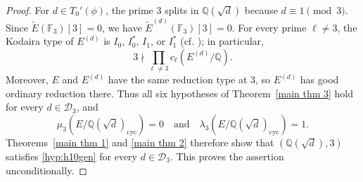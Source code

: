 \documentclass[12pt]{amsart}
\newtheorem{lemma}[theorem]{Lemma}
\newcommand{\Q}{\mathbb{Q}}
\newcommand{\F}{\mathbb{F}}
\newcommand{\op}[1]{\operatorname{#1}}
\numberwithin{equation}{section}
\begin{document}
\begin{proof}
For $d\in T_0'(\phi)$, the prime $3$ splits in $\Q(\sqrt d)$ because $d\equiv1\pmod 3$. Since $\widetilde E(\F_3)[3]=0$, we have $\widetilde E^{(d)}(\F_3)[3]=0$. For every prime $\ell\neq3$, the Kodaira type of $E^{(d)}$ is $I_0$, $I_0^*$, $I_1$, or $I_1^*$ (cf. \cite[Table~3]{BKOS}); in particular,
\[
3\nmid\prod_{\ell\neq3}c_\ell(E^{(d)}/\Q).
\]
Moreover, $E$ and $E^{(d)}$ have the same reduction type at $3$, so $E^{(d)}$ has good ordinary reduction there. Thus all six hypotheses of Theorem~\ref{main thm 3} hold for every $d\in\mathcal D_3$, and
\[
\mu_3(E/\Q(\sqrt d)_{\op{cyc}})=0
\quad\text{and}\quad
\lambda_3(E/\Q(\sqrt d)_{\op{cyc}})=1.
\]
Theorems~\ref{main thm 1} and \ref{main thm 2} therefore show that $(\Q(\sqrt d),3)$ satisfies \eqref{hyp:h10gen} for every $d\in\mathcal D_3$. This proves the assertion unconditionally.
\end{proof}






\end{document}
